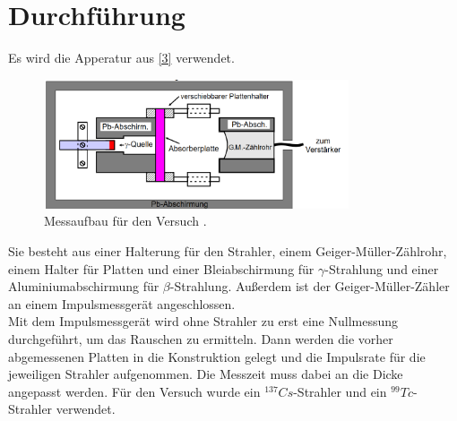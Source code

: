 \section{Durchführung}
\label{sec:Durchführung}
Es wird die Apperatur aus \autoref{3} verwendet. 
\begin{figure}[H]
  \centering
  \includegraphics[width=9cm]{3.png}
  \caption{Messaufbau für den Versuch \cite{sample}.}
  \label{3}
\end{figure}
Sie besteht aus einer Halterung für den Strahler, einem Geiger-Müller-Zählrohr, einem Halter für Platten und einer Bleiabschirmung für $\gamma$-Strahlung und einer Aluminiumabschirmung für $\beta$-Strahlung. Außerdem ist der Geiger-Müller-Zähler an einem Impulsmessgerät angeschlossen.\\
Mit dem Impulsmessgerät wird ohne Strahler zu erst eine Nullmessung durchgeführt, um das Rauschen zu ermitteln. Dann werden die vorher abgemessenen Platten in die Konstruktion gelegt und die Impulsrate für die jeweiligen Strahler aufgenommen. Die Messzeit muss dabei an die Dicke angepasst werden. Für den Versuch wurde ein $^137 Cs$-Strahler und ein $^99 Tc$-Strahler verwendet.
